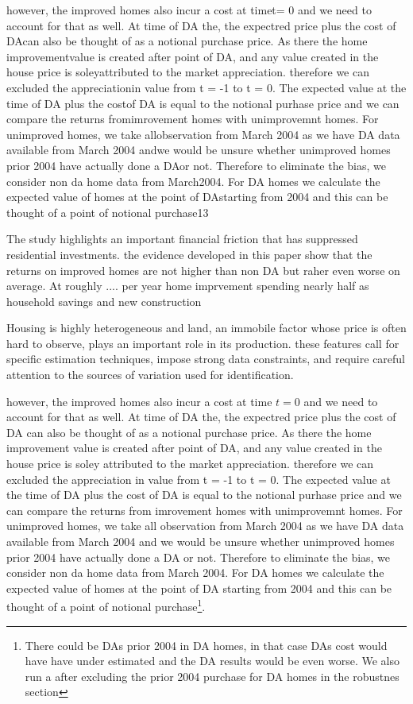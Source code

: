 however,  the  improved  homes  also  incur  a  cost  at  timet=  0  and  we  need  to account for that as well.  At time of DA the, the expectred price plus the cost of DAcan also be thought of as a notional purchase price.  As there the home improvementvalue is created after point of DA, and any value created in the house price is soleyattributed to the market appreciation.  therefore we can excluded the appreciationin value from t = -1 to t = 0.  The expected value at the time of DA plus the costof DA is equal to the notional purhase price and we can compare the returns fromimrovement homes with unimprovemnt homes.  For unimproved homes, we take allobservation from March 2004 as we have DA data available from March 2004 andwe would be unsure whether unimproved homes prior 2004 have actually done a DAor not.  Therefore to eliminate the bias, we consider non da home data from March2004.  For DA homes we calculate the expected value of homes at the point of DAstarting from 2004 and this can be thought of a point of notional purchase13



The study highlights an important financial friction that has suppressed residential investments. the evidence developed in this paper show that the returns on improved homes are not higher than non DA but raher even worse on average.
At roughly .... per year home imprvement spending nearly half as household savings and new construction




Housing is highly heterogeneous and land, an immobile factor whose price is often hard to observe, plays an important role in its production. these features call for specific estimation techniques, impose strong data constraints, and require careful attention to the sources of variation used for identification.

however, the improved homes also incur a cost at time $t = 0$ and we need to account for that as well. At time of DA the, the expectred price plus the cost of DA can also be thought of as a notional purchase price. As there the home improvement value is created after point of DA, and any value created in the house price is soley attributed to the market appreciation. therefore we can excluded the appreciation in value from t = -1 to t = 0. The expected value at the time of DA plus the cost of DA is equal to the notional purhase price and we can compare the returns from imrovement homes with unimprovemnt homes. For unimproved homes, we take all observation from March 2004 as we have DA data available from March 2004 and we would be unsure whether unimproved homes prior 2004 have actually done a DA or not. Therefore to eliminate the bias, we consider non da home data from March 2004. For DA homes we calculate the expected value of homes at the point of DA starting from 2004 and this can be thought of a point of notional purchase\footnote{There could be DAs prior 2004 in DA homes, in that case DAs cost would have have under estimated and the DA results would be even worse. We also run a after excluding the prior 2004 purchase for DA homes in the robustnes section}.




